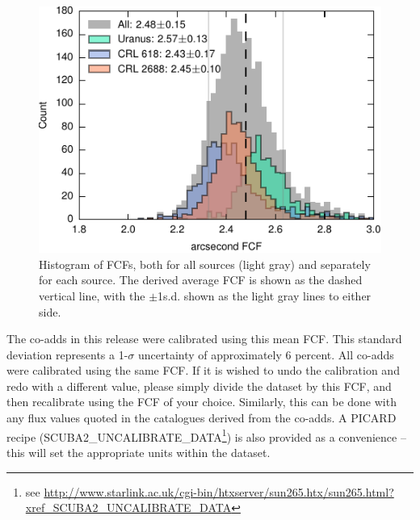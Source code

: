 \documentclass[twocolumn]{aastex6}
\begin{document}
\begin{figure}
  \centering
  \includegraphics{lrvalues-histo}
  \caption{Histogram of FCFs, both for all sources (light gray) and
    separately for each source. The derived average FCF is shown as
    the dashed vertical line, with the $\pm$1s.d. shown as the light
    gray lines to either side.}
  \label{fig:calibhist}
\end{figure}

The co-adds in this release were calibrated using this mean FCF.  This
standard deviation represents a 1-$\sigma$ uncertainty of
approximately 6 percent. All co-adds were calibrated using the same
FCF. If it is wished to undo the calibration and redo with a different
value, please simply divide the dataset by this FCF, and then
recalibrate using the FCF of your choice. Similarly, this can be done
with any flux values quoted in the catalogues derived from the
co-adds. A PICARD recipe (SCUBA2\_UNCALIBRATE\_DATA\footnote{see
  \url{http://www.starlink.ac.uk/cgi-bin/htxserver/sun265.htx/sun265.html?xref_SCUBA2_UNCALIBRATE_DATA}})
is also provided as a convenience -- this will set the appropriate
units within the dataset.
\end{document}
